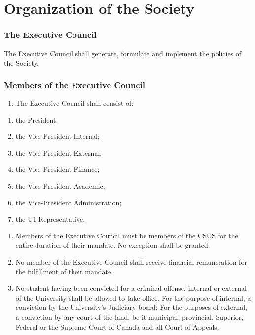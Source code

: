 \part{Organization of the
Society}\label{organization-of-the-society}

\section{The Executive Council}\label{the-executive-council}

The Executive Council shall generate, formulate and implement the
policies of the Society.

\section{Members of the Executive
Council}\label{members-of-the-executive-council}

\begin{enumerate}
\def\labelenumi{\arabic{enumi}.}
\tightlist
\item
  The Executive Council shall consist of:
\end{enumerate}

\begin{enumerate}
\def\labelenumi{(\alph{enumi})}
\tightlist
\item
  the President;
\item
  the Vice-President Internal;
\item
  the Vice-President External;
\item
  the Vice-President Finance;
\item
  the Vice-President Academic;
\item
  the Vice-President Administration;
\item
  the U1 Representative.
\end{enumerate}

\begin{enumerate}
\def\labelenumi{\arabic{enumi}.}
\setcounter{enumi}{1}
\item
  Members of the Executive Council must be members of the CSUS for the
  entire duration of their mandate. No exception shall be granted.
\item
  No member of the Executive Council shall receive financial
  remuneration for the fulfillment of their mandate.
\item
  No student having been convicted for a criminal offense, internal or
  external of the University shall be allowed to take office. For the
  purpose of internal, a conviction by the University's Judiciary board;
  For the purposes of external, a conviction by any court of the land,
  be it municipal, provincial, Superior, Federal or the Supreme Court of
  Canada and all Court of Appeals.
\end{enumerate}


